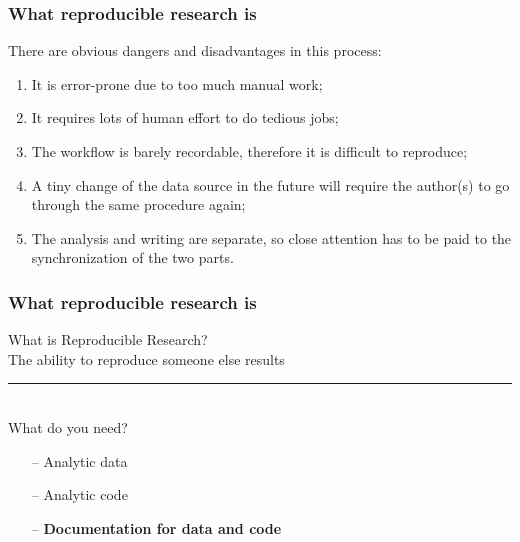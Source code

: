 \documentclass{beamer}
\begin{document}
\begin{frame}
\frametitle{What reproducible research is}

\Large There are obvious dangers and disadvantages in this process:
\small\begin{enumerate}
    \item It is error-prone due to too much manual work;
    \item It requires lots of human effort to do tedious jobs; 
    \item The workflow is barely recordable, therefore it is difficult to reproduce;
    \item A tiny change of the data source in the future will require the author(s) to go through the same procedure again;
    \item The analysis and writing are separate, so close attention has to be paid to the synchronization of the two parts.
\end{enumerate}
\end{frame}


\begin{frame}
\frametitle{What reproducible research is}
\Large \centering What is Reproducible Research?\\ 
{\sc The ability to reproduce someone else results}\\
\rule{\textwidth}{0.1pt}\\
\Large \centering What do you need?\\ 
\begin{itemize}
\item[--] Analytic data 
\item[--] Analytic code
\item[--] {\bf Documentation for data and code} 
\end{itemize}
\end{frame}


\end{document}
